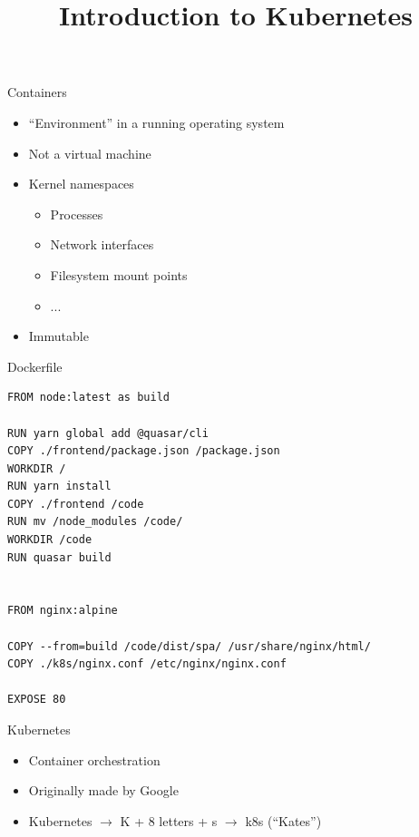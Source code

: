 \documentclass{dcpresentation}
\title{Introduction to Kubernetes}
\author{}
\institute{SciLifeLab Data Centre}
\date{}
\begin{document}
 \begin{frame}
  \maketitle
 \end{frame}

 
 \begin{frame}{Containers}
  \begin{itemize}
   \item ``Environment'' in a running operating system
   \item Not a virtual machine
   \item Kernel namespaces
   \begin{itemize}
    \item Processes
    \item Network interfaces
    \item Filesystem mount points
    \item ...
   \end{itemize}
   \item Immutable
  \end{itemize}
 \end{frame}
 
 \begin{frame}[fragile]{Dockerfile}
 \scriptsize
  \begin{verbatim}
FROM node:latest as build

RUN yarn global add @quasar/cli
COPY ./frontend/package.json /package.json
WORKDIR /
RUN yarn install
COPY ./frontend /code
RUN mv /node_modules /code/
WORKDIR /code
RUN quasar build


FROM nginx:alpine

COPY --from=build /code/dist/spa/ /usr/share/nginx/html/
COPY ./k8s/nginx.conf /etc/nginx/nginx.conf

EXPOSE 80
  \end{verbatim}
 \end{frame}


 \begin{frame}{Kubernetes}
  \begin{itemize}
   \item Container orchestration
   \item Originally made by Google
   \item Kubernetes $\rightarrow$ K + 8 letters + s $\rightarrow$ k8s (``Kates'')
  \end{itemize}
 \end{frame}
 
\end{document}

